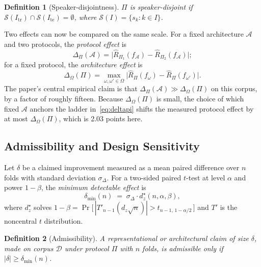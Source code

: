 \documentclass[journal,onecolumn,11pt,draftclsnofoot]{IEEEtran}   %
\newtheorem{definition}{Definition}
\begin{document}
\begin{definition}[Speaker-disjointness]
$\Pi$ is speaker-disjoint if $\mathcal{S}(I_{\mathrm{tr}}) \cap
\mathcal{S}(I_{\mathrm{te}}) = \emptyset$, where $\mathcal{S}(I) = \{s_k : k \in
I\}$.
\end{definition}

Two effects can now be compared on the same scale. For a fixed architecture
$\mathcal{A}$ and two protocols, the \emph{protocol effect} is
\begin{equation}
  \Delta_\Pi(\mathcal{A}) =
  \big|\widehat{R}_{\Pi_1}(f_{\mathcal{A}}) -
       \widehat{R}_{\Pi_2}(f_{\mathcal{A}})\big| ;
  \label{eq:deltapi}
\end{equation}
for a fixed protocol, the \emph{architecture effect} is
\begin{equation}
  \Delta_\Omega(\Pi) = \max_{\omega, \omega' \in \Omega}
  \big|\widehat{R}_{\Pi}(f_{\omega}) - \widehat{R}_{\Pi}(f_{\omega'})\big| .
  \label{eq:deltaomega}
\end{equation}
The paper's central empirical claim is that $\Delta_\Pi(\mathcal{A}) \gg
\Delta_\Omega(\Pi)$ on this corpus, by a factor of roughly fifteen. Because
$\Delta_\Omega(\Pi)$ is small, the choice of which fixed $\mathcal{A}$ anchors
the ladder in~\eqref{eq:deltapi} shifts the measured protocol effect by at most
$\Delta_\Omega(\Pi)$, which is 2.03 points here.

\subsection{Admissibility and Design Sensitivity}
\label{sec:admissible}
Let $\delta$ be a claimed improvement measured as a mean paired difference over
$n$ folds with standard deviation $\sigma_\Delta$. For a two-sided paired
$t$-test at level $\alpha$ and power $1-\beta$, the \emph{minimum detectable
effect} is
\begin{equation}
  \delta_{\min}(n) \;=\; \sigma_\Delta \cdot d_z^{\star}(n, \alpha, \beta),
  \label{eq:mde}
\end{equation}
where $d_z^{\star}$ solves
$1 - \beta = \Pr\big[\,|T'_{n-1}(d_z\sqrt{n})| > t_{n-1,\,1-\alpha/2}\,\big]$
and $T'$ is the noncentral $t$ distribution.

\begin{definition}[Admissibility]
\label{def:admissible}
A representational or architectural claim of size $\delta$, made on corpus
$\mathcal{D}$ under protocol $\Pi$ with $n$ folds, is \emph{admissible} only if
$|\delta| \geq \delta_{\min}(n)$.
\end{definition}
\end{document}
